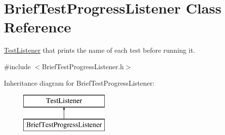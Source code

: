 \hypertarget{class_brief_test_progress_listener}{\section{Brief\-Test\-Progress\-Listener Class Reference}
\label{class_brief_test_progress_listener}
}


\hyperlink{class_test_listener}{Test\-Listener} that prints the name of each test before running it.  




{\ttfamily \#include $<$Brief\-Test\-Progress\-Listener.\-h$>$}

Inheritance diagram for Brief\-Test\-Progress\-Listener\-:\begin{figure}[H]
\begin{center}
\leavevmode
\includegraphics[height=2.000000cm]{class_brief_test_progress_listener}
\end{center}
\end{figure}
